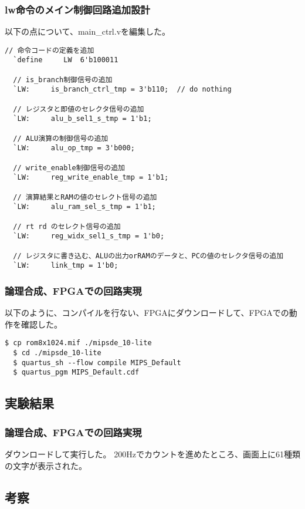 \subsubsection{lw命令のメイン制御回路追加設計}
以下の点について、main\_ctrl.vを編集した。
\begin{lstlisting}[caption={lw命令の追加設計},label={lw命令の追加設計}]
  // 命令コードの定義を追加
  `define     LW  6'b100011

  // is_branch制御信号の追加
  `LW:     is_branch_ctrl_tmp = 3'b110;  // do nothing
  
  // レジスタと即値のセレクタ信号の追加
  `LW:     alu_b_sel1_s_tmp = 1'b1;

  // ALU演算の制御信号の追加
  `LW:     alu_op_tmp = 3'b000;

  // write_enable制御信号の追加
  `LW:     reg_write_enable_tmp = 1'b1;

  // 演算結果とRAMの値のセレクト信号の追加
  `LW:     alu_ram_sel_s_tmp = 1'b1;

  // rt rd のセレクト信号の追加
  `LW:     reg_widx_sel1_s_tmp = 1'b0;

  // レジスタに書き込む、ALUの出力orRAMのデータと、PCの値のセレクタ信号の追加
  `LW:     link_tmp = 1'b0;
\end{lstlisting}

\subsubsection{論理合成、FPGAでの回路実現}
以下のように、コンパイルを行ない、FPGAにダウンロードして、FPGAでの動作を確認した。

\begin{lstlisting}[caption={コンパイル、ダウンロード},label={コンパイル、ダウンロード4-2}]
  $ cp rom8x1024.mif ./mipsde_10-lite
  $ cd ./mipsde_10-lite
  $ quartus_sh --flow compile MIPS_Default
  $ quartus_pgm MIPS_Default.cdf 
\end{lstlisting}  

\subsection{実験結果}
\subsubsection{論理合成、FPGAでの回路実現}
ダウンロードして実行した。
200Hzでカウントを進めたところ、画面上に61種類の文字が表示された。

\subsection{考察}
